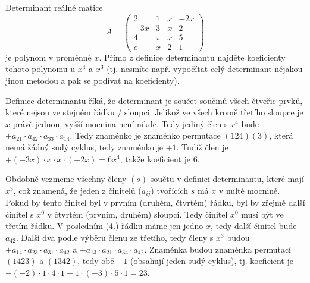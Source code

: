 \documentclass[12pt]{article}					%
\begin{document}
    \begin{priklad}[12.1]
        Determinant reálné matice
        $$ A = \begin{pmatrix} 2 & 1 & x & -2x \\ -3x & 3 & x & 2 \\ 4 & \pi & x & 5 \\ e & x & 2 & 1 \end{pmatrix} $$
        je polynom v proměnné $x$. Přímo z definice determinantu najděte koeficienty tohoto polynomu u $x^4$ a $x^3$ (tj. nesmíte např. vypočítat celý determinant nějakou jinou metodou a pak se podívat na koeficienty).

        \begin{reseni}
            Definice determinantu říká, že determinant je součet součinů všech čtveřic prvků, které nejsou ve stejném řádku / sloupci. Jelikož ve všech kromě třetího sloupce je $x$ právě jednou, vyšší mocnina není nikde. Tedy jediný člen s $x^4$ bude $±a_{21}·a_{42}·a_{33}·a_{14}$. Tedy znaménko je znaménko permutace $(124)(3)$, která nemá žádný sudý cyklus, tedy znaménko je $+1$. Tudíž člen je $+(-3x)·x·x·(-2x) = 6x^4$, takže koeficient je $6$.

            Obdobně vezmeme všechny členy $(s)$ součtu v definici determinantu, které mají $x^3$, což znamená, že jeden z činitelů ($a_{ij}$) tvořících $s$ má $x$ v nulté mocnině. Pokud by tento činitel byl v prvním (druhém, čtvrtém) řádku, byl by zřejmě další činitel s $x^0$ v čtvrtém (prvním, druhém) sloupci. Tedy činitel $x^0$ musí být ve třetím řádku. V posledním (4.) řádku máme jen jedno $x$, tedy další činitel bude $a_{42}$. Další dva podle výběru členu ze třetího, tedy členy s $x^3$ budou $±a_{14}·a_{23}·a_{31}·a_{42}$ a $±a_{13}·a_{21}·a_{34}·a_{42}$. Znaménka budou znaménka permutací $(1423)$ a $(1342)$, tedy obě $-1$ (obsahují jeden sudý cyklus), tj. koeficient je $-(-2)·1·4·1 -1·(-3)·5·1 = 23$.
        \end{reseni}
    \end{priklad}

\pagebreak
\end{document}
